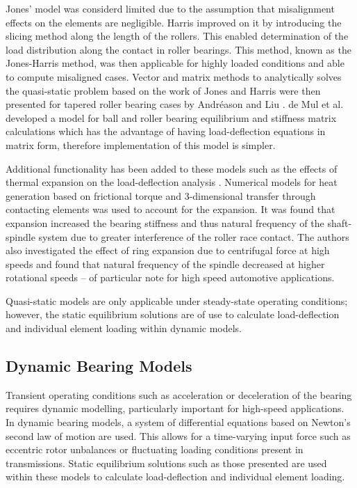 Jones' model was considerd limited due to the assumption that misalignment effects on the elements are negligible. Harris \cite{Harris1984} improved on it by introducing the slicing method along the length of the rollers. This enabled determination of the load distribution along the contact in roller bearings. This method, known as the Jones-Harris method, was then applicable for highly loaded conditions and able to compute misaligned cases. Vector and matrix methods to analytically solves the quasi-static problem based on the work of Jones and Harris were then presented for tapered roller bearing cases by Andréason \cite{Andreason1973} and Liu \cite{Liu1976}. de Mul et al. \cite{DeMul1989_2} developed a model for ball and roller bearing equilibrium and stiffness matrix calculations which has the advantage of having load-deflection equations in matrix form, therefore implementation of this model is simpler.

Additional functionality has been added to these models such as the effects of thermal expansion on the load-deflection analysis \cite{Jorgensen1997}. Numerical models for heat generation based on frictional torque and 3-dimensional transfer through contacting elements was used to account for the expansion. It was found that expansion increased the bearing stiffness and thus natural frequency of the shaft-spindle system due to greater interference of the roller race contact. The authors also investigated the effect of ring expansion due to centrifugal force at high speeds \cite{Jorgensen1998} and found that natural frequency of the spindle decreased at higher rotational speeds – of particular note for high speed automotive applications.

Quasi-static models are only applicable under steady-state operating conditions; however, the static equilibrium solutions \cite{Andreason1973} \cite{Liu1976} \cite{DeMul1989_1} are of use to calculate load-deflection and individual element loading within dynamic models.

\subsection{Dynamic Bearing Models}
Transient operating conditions such as acceleration or deceleration of the bearing requires dynamic modelling, particularly important for high-speed applications. In dynamic bearing models, a system of differential equations based on Newton’s second law of motion are used. This allows for a time-varying input force such as eccentric rotor unbalances or fluctuating loading conditions present in transmissions. Static equilibrium solutions such as those presented are used within these models to calculate load-deflection and individual element loading. 

